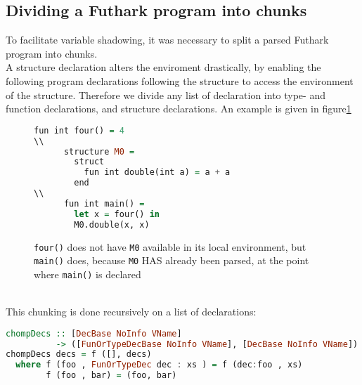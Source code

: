 \subsection{Dividing a Futhark program into chunks}
To facilitate variable shadowing, it was necessary to split a parsed Futhark
program into chunks.
\\
A structure declaration alters the enviroment drastically, by enabling the
following program declarations following the structure to access the environment
of the structure.
Therefore we divide any list of declaration into type- and function
declarations, and structure declarations.
An example is given in figure\ref{chunks}
\begin{figure}\label{chunks}
  \begin{tcolorbox}
    \begin{lstlisting}[language=Haskell]
      fun int four() = 4
\\
      structure M0 =
        struct
          fun int double(int a) = a + a
        end
\\
      fun int main() =
        let x = four() in
        M0.double(x, x)
  \end{lstlisting}
  \texttt{four()} does not have \texttt{M0} available in its local environment, but
    \texttt{main()} does, because \texttt{M0} HAS already been parsed, at the point where
    \texttt{main()} is declared
  \end{tcolorbox}
\end{figure}
\\
This chunking is done recursively on a list of declarations:
\begin{lstlisting}[language=Haskell]
chompDecs :: [DecBase NoInfo VName]
          -> ([FunOrTypeDecBase NoInfo VName], [DecBase NoInfo VName])
chompDecs decs = f ([], decs)
  where f (foo , FunOrTypeDec dec : xs ) = f (dec:foo , xs)
        f (foo , bar) = (foo, bar)
\end{lstlisting}
